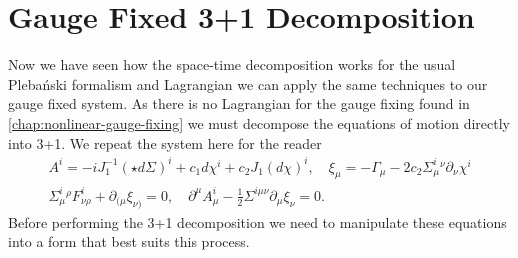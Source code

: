\documentclass[10pt]{report}
\newcommand{\pleb}[0]{Pleba\'nski}
\theoremstyle{definition}
\begin{document}
    \section{Gauge Fixed 3+1 Decomposition} \label{sec:pleb-num-gauge-fixed-1+3-decomposition}
    Now we have seen how the space-time decomposition works for the usual \pleb{} formalism and Lagrangian we can apply the same techniques to our gauge fixed system. As there is no Lagrangian for the gauge fixing found in \cref{chap:nonlinear-gauge-fixing} we must decompose the equations of motion directly into 3+1. We repeat the system here for the reader
    \begin{align}
        A^i = -i J_1^{-1}(\star d\Sigma)^i + c_1 d\chi^i + c_2 J_1(d\chi)^i, \quad \xi_\mu = -\Gamma_\mu - 2c_2 \Sigma^i_\mu{}^\nu \partial_\nu \chi^i \\
        \Sigma^i_\mu{}^\rho F^i_{\nu\rho} + \partial_{(\mu} \xi_{\nu)} = 0, \quad \partial^\mu A^i_\mu - \frac{1}{2} \Sigma^{i\mu\nu} \partial_\mu \xi_\nu = 0.
    \end{align}
    Before performing the 3+1 decomposition we need to manipulate these equations into a form that best suits this process. 
\end{document}
